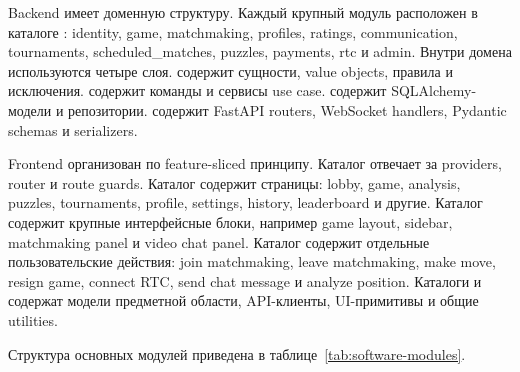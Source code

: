 Backend имеет доменную структуру. Каждый крупный модуль расположен в каталоге : identity, game, matchmaking, profiles, ratings, communication, tournaments, scheduled\_matches, puzzles, payments, rtc и admin. Внутри домена используются четыре слоя.  содержит сущности, value objects, правила и исключения.  содержит команды и сервисы use case.  содержит SQLAlchemy-модели и репозитории.  содержит FastAPI routers, WebSocket handlers, Pydantic schemas и serializers.

Frontend организован по feature-sliced принципу. Каталог  отвечает за providers, router и route guards. Каталог  содержит страницы: lobby, game, analysis, puzzles, tournaments, profile, settings, history, leaderboard и другие. Каталог  содержит крупные интерфейсные блоки, например game layout, sidebar, matchmaking panel и video chat panel. Каталог  содержит отдельные пользовательские действия: join matchmaking, leave matchmaking, make move, resign game, connect RTC, send chat message и analyze position. Каталоги  и  содержат модели предметной области, API-клиенты, UI-примитивы и общие utilities.

Структура основных модулей приведена в таблице~\ref{tab:software-modules}.

